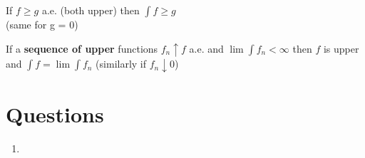 \documentclass[a4paper, 12pt]{article}
\newcommand{\bt}[1]{\textbf{#1}} %
\begin{document}
\begin{multicols}{2}
If $f \geq g$ a.e. (both upper) then $\int f \geq g$\\
(same for g = 0)

If a \bt{sequence of upper} functions $f_n \uparrow f$ a.e. and 
$\lim \int f_n < \infty$ then $f$ is upper and 
$\int f = \lim \int f_n$
(similarly if $f_n \downarrow 0$)

\section{Questions}
\begin{enumerate}
    \item
\end{enumerate}


\end{multicols}
\end{document}

